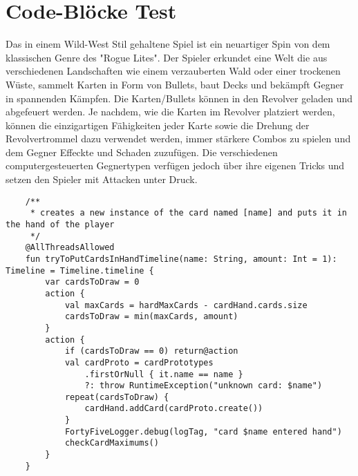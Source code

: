 
\chapter{Code-Blöcke Test}\label{ch:code-blocke-test}

\renewcommand{\kapitelautor}{Autor: Marvin}

Das in einem Wild-West Stil gehaltene Spiel ist ein neuartiger Spin von dem klassischen Genre des "Rogue Lites".
Der Spieler erkundet eine Welt die aus verschiedenen Landschaften wie einem verzauberten Wald oder einer trockenen Wüste,
sammelt Karten in Form von Bullets, baut Decks und bekämpft Gegner in spannenden Kämpfen.
Die Karten/Bullets können in den Revolver geladen und abgefeuert werden.
Je nachdem, wie die Karten im Revolver platziert werden, können die einzigartigen Fähigkeiten jeder Karte sowie die
Drehung der Revolvertrommel dazu verwendet werden, immer stärkere Combos zu spielen und dem Gegner Effeckte und Schaden zuzufügen.
Die verschiedenen computergesteuerten Gegnertypen verfügen jedoch über ihre eigenen Tricks und setzen den Spieler mit Attacken unter Druck.

\begin{verbatim}
    /**
     * creates a new instance of the card named [name] and puts it in the hand of the player
     */
    @AllThreadsAllowed
    fun tryToPutCardsInHandTimeline(name: String, amount: Int = 1): Timeline = Timeline.timeline {
        var cardsToDraw = 0
        action {
            val maxCards = hardMaxCards - cardHand.cards.size
            cardsToDraw = min(maxCards, amount)
        }
        action {
            if (cardsToDraw == 0) return@action
            val cardProto = cardPrototypes
                .firstOrNull { it.name == name }
                ?: throw RuntimeException("unknown card: $name")
            repeat(cardsToDraw) {
                cardHand.addCard(cardProto.create())
            }
            FortyFiveLogger.debug(logTag, "card $name entered hand")
            checkCardMaximums()
        }
    }
\end{verbatim}

